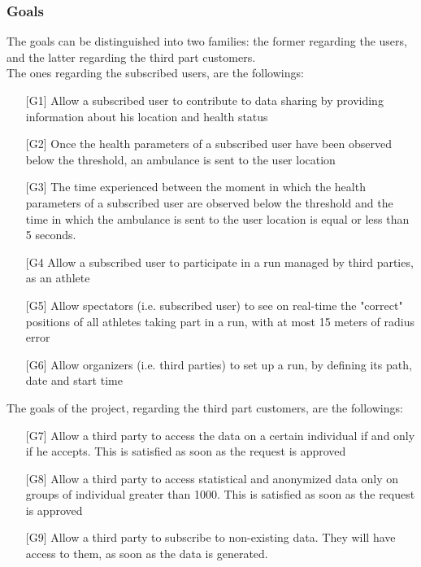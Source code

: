 \subsubsection{Goals}
The goals can be distinguished into two families: the former regarding the users, and the latter regarding the third part customers.\\
The ones regarding the subscribed users, are the followings:
\begin{enumerate}
\item[{[G1]}] Allow a subscribed user to contribute to data sharing by providing information about his location and health status
\item[{[G2]}] Once the health parameters of a subscribed user have been observed 
below the threshold, an ambulance is sent to the user location 
\item[{[G3]}] The time experienced between the moment in which the health parameters of a subscribed user are observed below the threshold and the time in which the ambulance is sent to the user location is equal or less than 5 seconds. 
\item[{[G4}] Allow a subscribed user to participate in a run managed by third parties, as an athlete
\item[{[G5]}] Allow spectators (i.e. subscribed user) to see on real-time the "correct" positions of all athletes taking part in a run, with at most 15 meters of radius error
\item[{[G6]}] Allow organizers (i.e. third parties) to set up a run, by defining its path, date and start time
\end{enumerate}
The goals of the project, regarding the third part customers, are the followings:
\begin{enumerate}
\item[{[G7]}] Allow a third party to access the data on a certain individual if and only if he accepts. This is satisfied as soon as the request is approved
\item[{[G8]}] Allow a third party to access statistical and anonymized data only on groups of individual greater than 1000. This is satisfied as soon as the request is approved
\item[{[G9]}] Allow a third party to subscribe to non-existing data. They will have access to them, as soon as the data is generated. 
\end{enumerate}